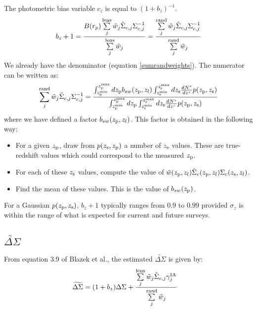 \documentclass[onecolumn,amsmath,aps,fleqn, superscriptaddress]{revtex4}
\begin{document}
The photometric bias variable $c_z$ is equal to $(1+b_z)^{-1}$.
\begin{equation}
b_z+1 = \frac{B(r_p) \sum\limits^{\rm lens}_{j} \tilde{w}_j \tilde{\Sigma}_{c,j} \Sigma_{c,j}^{-1}}{\sum\limits^{\rm lens}_{j} \tilde{w}_j} = \frac{\sum\limits^{\rm rand}_{j} \tilde{w}_j \tilde{\Sigma}_{c,j} \Sigma_{c,j}^{-1}}{\sum\limits^{\rm rand}_{j} \tilde{w}_j}
\label{photozbias}
\end{equation}
We already have the denominator (equation \ref{sumrandweights}). The numerator can be written as:
\begin{equation}
\sum\limits^{\rm rand}_{j} \tilde{w}_j \tilde{\Sigma}_{c,j} \Sigma_{c,j}^{-1}  = \frac{\int_{z_{\rm p}^{\rm min}}^{z_{\rm p}^{\rm max}}dz_{\rm p} b_{sw}(z_{\rm p}, z_l) \int_{z_{\rm s}^{\rm min}}^{z_{\rm s}^{\rm max}}dz_{\rm s} \frac{dN^s}{dz^s} p(z_{\rm p}, z_{\rm s})}{\int_{z_{\rm p}^{\rm min}}^{z_{\rm p}^{\rm max}}dz_{\rm p}\int_{z_{\rm s}^{\rm min}}^{z_{\rm s}^{\rm max}}dz_{\rm s} \frac{dN^s}{dz^s} p(z_{\rm p}, z_{\rm s})}
\label{photoz}
\end{equation}
where we have defined a factor $b_{sw}(z_{\rm p}, z_l)$. This factor is obtained in the following way:
\begin{itemize}
\item{For a given $z_{\rm p}$, draw from $p(z_{\rm s}, z_{\rm p})$ a number of $z_{\rm s}$ values. These are true-redshift values which could correspond to the measured $z_{\rm p}$.}
\item{For each of these $z_{\rm s}$ values, compute the value of $\tilde{w}(z_{\rm p}, z_l) \tilde{\Sigma}_c(z_{\rm p}, z_l) \Sigma_c(z_{\rm s}, z_l)$.}
\item{Find the mean of these values. This is the value of $b_{sw}(z_{\rm p})$.}
\end{itemize}
For a Gaussian $p(z_{\rm p}, z_{\rm s})$, $b_z+1$ typically ranges from $0.9$ to $0.99$ provided $\sigma_z$ is within the range of what is expected for current and future surveys.

\subsection{$\widetilde{\Delta \Sigma}$}
From equation 3.9 of Blazek et al., the estimated $\widetilde{\Delta \Sigma}$ is given by:
\begin{align}
\widetilde{\Delta \Sigma}&= (1+b_z) \Delta \Sigma + \frac{\sum\limits_{j}^{\rm lens} \tilde{w}_j \tilde{\Sigma}_{c,j} \gamma^{\rm IA}_j }{\sum\limits_{j}^{\rm rand} \tilde{w}_j} 
\label{deltasigma}
\end{align}
\end{document}
